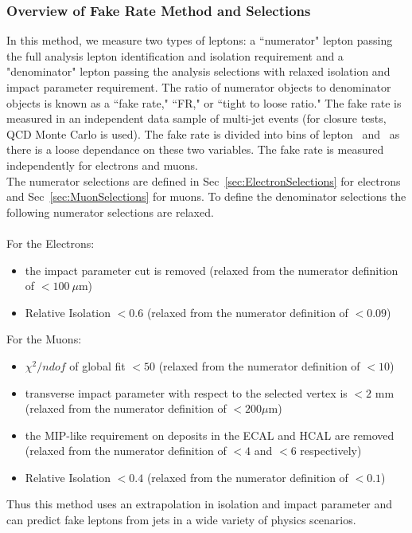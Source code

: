       		\subsubsection{Overview of Fake Rate Method and Selections}
		In this method, we measure two types of leptons: a ``numerator" lepton passing the full analysis lepton identification and isolation requirement  and a "denominator" lepton passing the analysis selections with relaxed isolation and impact parameter requirement. The ratio of numerator objects to denominator objects is known as a ``fake rate," ``FR," or ``tight to loose ratio."  The fake rate is measured in an independent data sample of multi-jet events (for closure tests, QCD Monte Carlo is used). The fake rate is divided into bins of lepton \pt \ and \aeta \ as there is a loose dependance on these two variables. The fake rate is measured independently for electrons and muons.\\

The numerator selections are defined in Sec~\ref{sec:ElectronSelections} for electrons and Sec~\ref{sec:MuonSelections} for muons. To define the denominator selections the following numerator selections are relaxed.\\\\
For the Electrons:
\begin{itemize}
\item the impact parameter cut is removed (relaxed from the numerator definition of $\lt 100 \ \mu$m)
\item Relative Isolation $\lt 0.6$ (relaxed from the numerator definition of $\lt 0.09$)
\end{itemize}
For the Muons:
\begin{itemize}
\item $\chi ^{2}/ndof$ of global fit $\lt 50$ (relaxed from the numerator definition of $\lt 10$)
\item transverse impact parameter with respect to the selected vertex is $\lt 2$ mm (relaxed from the numerator definition of $\lt 200 \mu$m)
\item the MIP-like requirement on deposits in the ECAL and HCAL are removed (relaxed from the numerator definition of $\lt 4$ and $\lt 6$ \GeV respectively)
\item Relative Isolation $\lt 0.4$ (relaxed from the numerator definition of $\lt 0.1$)
\end{itemize}


Thus this method uses an extrapolation in isolation and impact parameter and can predict fake leptons from jets in a wide variety of physics scenarios.\\

